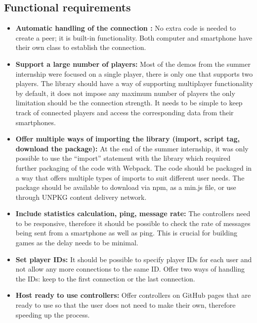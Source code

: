 \documentclass{l4proj}
\begin{document}
\subsection{Functional requirements} 
\begin{itemize}
\setlength\itemsep{1em}

  \item \textbf{Automatic handling of the connection :}
  No extra code is needed to create a peer; it is built-in functionality. Both computer and smartphone have their own class to establish the connection.
  
  \item \textbf{Support a large number of players:} 
  Most of the demos from the summer internship were focused on a single player, there is only one that supports two players. The library should have a way of supporting multiplayer functionality by default, it does not impose any maximum number of players the only limitation should be the connection strength. It needs to be simple to keep track of connected players and access the corresponding data from their smartphones. 
  
  \item \textbf{Offer multiple ways of importing the library (import, script tag, download the package):} 
  At the end of the summer internship, it was only possible to use the “import” statement with the library which required further packaging of the code with Webpack. The code should be packaged in a way that offers multiple types of imports to suit different user needs. The package should be available to download via npm, as a min.js file, or use through UNPKG content delivery network. 
  
  \item \textbf{Include statistics calculation, ping, message rate:} The controllers need to be responsive, therefore it should be possible to check the rate of messages being sent from a smartphone as well as ping. This is crucial for building games as the delay needs to be minimal. 

  \item \textbf{Set player IDs:} It should be possible to specify player IDs for each user and not allow any more connections to the same ID. Offer two ways of handling the IDs: keep to the first connection or the last connection.  

  \item \textbf{Host ready to use controllers:} Offer controllers on GitHub pages that are ready to use so that the user does not need to make their own, therefore speeding up the process.
  

\end{itemize}
\end{document}

